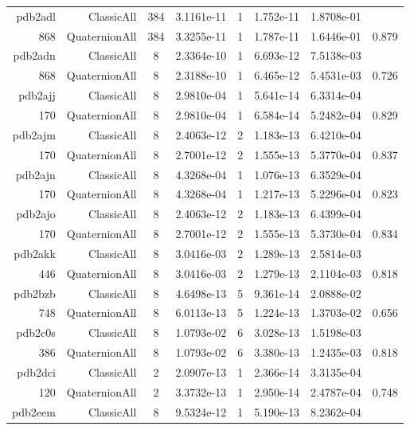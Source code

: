 \begin{xltabular}{\textwidth}{r|rcS[table-format=1.4e+2]cS[table-format=1.3e+2]S[table-format=1.4e+2]S[table-format=-1.3]}
{\color{red} pdb2adl } & ClassicAll & 384 & 3.1161e-11 & 1 & 1.752e-11 & 1.8708e-01 & \\
868 & QuaternionAll & 384 & 3.3255e-11 & 1 & 1.787e-11 & 1.6446e-01 & 0.879\\  \addlinespace
pdb2adn & ClassicAll & 8 & 2.3364e-10 & 1 & 6.693e-12 & 7.5138e-03 & \\
868 & QuaternionAll & 8 & 2.3188e-10 & 1 & 6.465e-12 & 5.4531e-03 & 0.726\\  \addlinespace
pdb2ajj & ClassicAll & 8 & 2.9810e-04 & 1 & 5.641e-14 & 6.3314e-04 & \\
170 & QuaternionAll & 8 & 2.9810e-04 & 1 & 6.584e-14 & 5.2482e-04 & 0.829\\  \addlinespace
pdb2ajm & ClassicAll & 8 & 2.4063e-12 & 2 & 1.183e-13 & 6.4210e-04 & \\
170 & QuaternionAll & 8 & 2.7001e-12 & 2 & 1.555e-13 & 5.3770e-04 & 0.837\\  \addlinespace
pdb2ajn & ClassicAll & 8 & 4.3268e-04 & 1 & 1.076e-13 & 6.3529e-04 & \\
170 & QuaternionAll & 8 & 4.3268e-04 & 1 & 1.217e-13 & 5.2296e-04 & 0.823\\  \addlinespace
pdb2ajo & ClassicAll & 8 & 2.4063e-12 & 2 & 1.183e-13 & 6.4399e-04 & \\
170 & QuaternionAll & 8 & 2.7001e-12 & 2 & 1.555e-13 & 5.3730e-04 & 0.834\\  \addlinespace
pdb2akk & ClassicAll & 8 & 3.0416e-03 & 2 & 1.289e-13 & 2.5814e-03 & \\
446 & QuaternionAll & 8 & 3.0416e-03 & 2 & 1.279e-13 & 2.1104e-03 & 0.818\\  \addlinespace
pdb2bzb & ClassicAll & 8 & 4.6498e-13 & 5 & 9.361e-14 & 2.0888e-02 & \\
748 & QuaternionAll & 8 & 6.0113e-13 & 5 & 1.224e-13 & 1.3703e-02 & 0.656\\  \addlinespace
pdb2c0s & ClassicAll & 8 & 1.0793e-02 & 6 & 3.028e-13 & 1.5198e-03 & \\
386 & QuaternionAll & 8 & 1.0793e-02 & 6 & 3.380e-13 & 1.2435e-03 & 0.818\\  \addlinespace
pdb2dci & ClassicAll & 2 & 2.0907e-13 & 1 & 2.366e-14 & 3.3135e-04 & \\
120 & QuaternionAll & 2 & 3.3732e-13 & 1 & 2.950e-14 & 2.4787e-04 & 0.748\\  \addlinespace
pdb2eem & ClassicAll & 8 & 9.5324e-12 & 1 & 5.190e-13 & 8.2362e-04 & \\

\end{xltabular}
